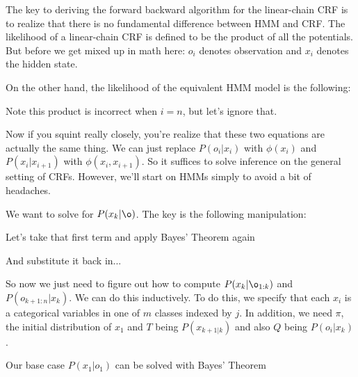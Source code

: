 \documentclass[12pt]{article}
\begin{document}
The key to deriving the forward backward algorithm for the linear-chain CRF is to realize that there is no fundamental difference between HMM and CRF.
The likelihood of a linear-chain CRF is defined to be the product of all the potentials. But before we get mixed up in math here: $o_i$ denotes observation and $x_i$ denotes the hidden state.


On the other hand, the likelihood of the equivalent HMM model is the following:

Note this product is incorrect when $i = n$, but let's ignore that.

Now if you squint really closely, you're realize that these two equations are actually the same thing. We can just replace $P(o_i|x_i)$ with $\phi(x_i)$ and $P(x_i|x_{i+1})$ with $\phi(x_i, x_{i+1})$. So it suffices to solve inference on the general setting of CRFs. However, we'll start on HMMs simply to avoid a bit of headaches.

We want to solve for $P(x_k|\o)$. The key is the following manipulation:


Let's take that first term and apply Bayes' Theorem again


And substitute it back in...


So now we just need to figure out how to compute $P(x_k|\o_{1:k})$ and $P(o_{k+1:n}|x_k)$. We can do this inductively. To do this, we specify that each $x_i$ is a categorical variables in one of $m$ classes indexed by $j$. In addition, we need $\pi$, the initial distribution of $x_1$ and $T$ being $P(x_{k+1|k})$ and also $Q$ being $P(o_i|x_k)$. 

Our base case $P(x_1|o_1)$ can be solved with Bayes' Theorem
\end{document}

